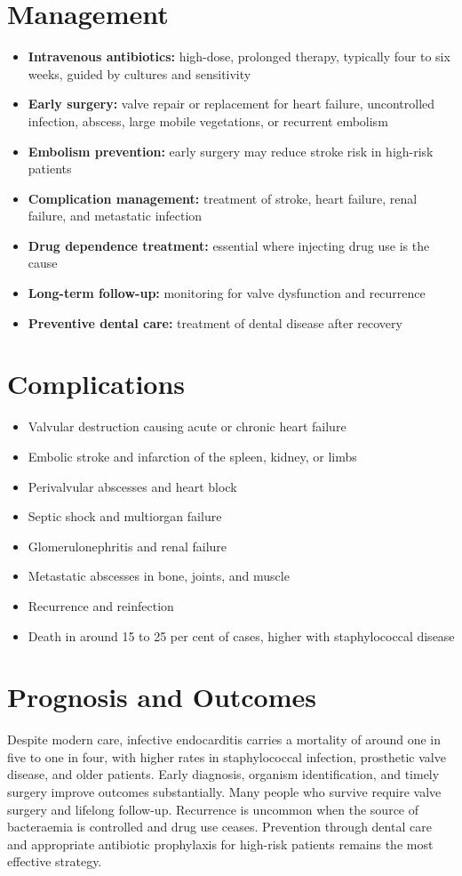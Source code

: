 \section*{Management}
\begin{itemize}
    \item \textbf{Intravenous antibiotics:} high-dose, prolonged therapy, typically four to six weeks, guided by cultures and sensitivity
    \item \textbf{Early surgery:} valve repair or replacement for heart failure, uncontrolled infection, abscess, large mobile vegetations, or recurrent embolism
    \item \textbf{Embolism prevention:} early surgery may reduce stroke risk in high-risk patients
    \item \textbf{Complication management:} treatment of stroke, heart failure, renal failure, and metastatic infection
    \item \textbf{Drug dependence treatment:} essential where injecting drug use is the cause
    \item \textbf{Long-term follow-up:} monitoring for valve dysfunction and recurrence
    \item \textbf{Preventive dental care:} treatment of dental disease after recovery
\end{itemize}

\section*{Complications}
\begin{itemize}
    \item Valvular destruction causing acute or chronic heart failure
    \item Embolic stroke and infarction of the spleen, kidney, or limbs
    \item Perivalvular abscesses and heart block
    \item Septic shock and multiorgan failure
    \item Glomerulonephritis and renal failure
    \item Metastatic abscesses in bone, joints, and muscle
    \item Recurrence and reinfection
    \item Death in around 15 to 25 per cent of cases, higher with staphylococcal disease
\end{itemize}

\section*{Prognosis and Outcomes}
Despite modern care, infective endocarditis carries a mortality of around one in five to one in four, with higher rates in staphylococcal infection, prosthetic valve disease, and older patients. Early diagnosis, organism identification, and timely surgery improve outcomes substantially. Many people who survive require valve surgery and lifelong follow-up. Recurrence is uncommon when the source of bacteraemia is controlled and drug use ceases. Prevention through dental care and appropriate antibiotic prophylaxis for high-risk patients remains the most effective strategy.

